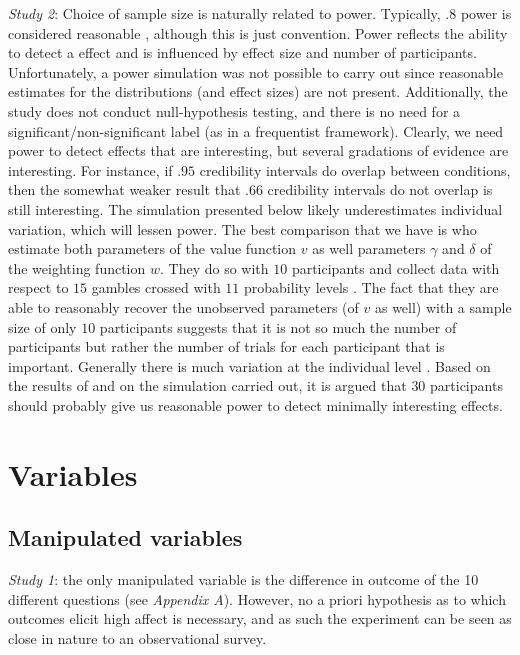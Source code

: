 \documentclass[12pt]{article}
\begin{document}
\emph{Study 2}: Choice of sample
size is naturally related to
power. Typically, $.8$ power is considered reasonable
\autocite{cohen1992power},
although this is just convention. Power reflects the
ability to detect a effect and is influenced by
effect size and number of participants.
Unfortunately, a power simulation was not possible
to carry out since reasonable estimates for the
distributions (and effect sizes) are not present.
Additionally, the study does not conduct
null-hypothesis testing, and there is no
need for a significant/non-significant label (as
in a frequentist framework). Clearly, we need
power to detect effects that are interesting,
but several gradations of evidence are interesting.
For instance, if $.95$ credibility intervals do overlap
between conditions,
then the somewhat weaker result that  $.66$
credibility intervals do not overlap is still
interesting.
The simulation presented below likely underestimates
individual variation, which will lessen power.
The best comparison that we have is
\textcite{gonzalez1999shape} who estimate both
parameters of the value function $v$ as well
parameters $\gamma$ and  $\delta$ of the weighting
function  $w$. They do so with  $10$ participants and
collect data with respect to $15$ gambles crossed
with  $11$ probability levels \autocite{gonzalez1999shape}.
The fact that they are able to reasonably recover
the unobserved parameters (of  $v$ as well) with
a sample size of only $10$ participants suggests
that it is not so much the number of participants
but rather the number of trials for each participant
that is important. Generally there is much
variation at the individual level
\autocite{gonzalez1999shape,
wu1996curvature,
abdellaoui2010separating}.
Based on the results of
\textcite{gonzalez1999shape}
and on the simulation carried
out, it is argued that $30$ participants should
probably give us reasonable power to detect
minimally interesting effects.

\section{Variables}

\subsection{Manipulated variables}

\emph{Study 1}: the only manipulated
variable is the difference in outcome
of the 10 different questions (see \emph{Appendix A}).
However, no a priori hypothesis as to which
outcomes elicit high affect is necessary,
and as such the experiment can be seen as
close in nature to an observational survey. \\
\end{document}

